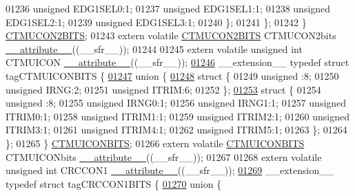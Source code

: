 \begin{DoxyCode}
01236       \textcolor{keywordtype}{unsigned} EDG1SEL0:1;
01237       \textcolor{keywordtype}{unsigned} EDG1SEL1:1;
01238       \textcolor{keywordtype}{unsigned} EDG1SEL2:1;
01239       \textcolor{keywordtype}{unsigned} EDG1SEL3:1;
01240     \};
01241   \};
01242 \} \hyperlink{a00008_d0/d65/a00360}{CTMUCON2BITS};
01243 \textcolor{keyword}{extern} \textcolor{keyword}{volatile} \hyperlink{a00008_d0/d65/a00360}{CTMUCON2BITS} CTMUCON2bits \hyperlink{a00009_a493c46f03454991ccc5aa7a6e1dfb2a7}{\_\_attribute\_\_}((\_\_sfr\_\_));
01244 
01245 \textcolor{keyword}{extern} \textcolor{keyword}{volatile} \textcolor{keywordtype}{unsigned} \textcolor{keywordtype}{int}  CTMUICON \hyperlink{a00009_a493c46f03454991ccc5aa7a6e1dfb2a7}{\_\_attribute\_\_}((\_\_sfr\_\_));
\hypertarget{a00009_source_l01246}{}\hyperlink{a00008}{01246} \_\_extension\_\_ \textcolor{keyword}{typedef} \textcolor{keyword}{struct }tagCTMUICONBITS \{
\hypertarget{a00009_source_l01247}{}\hyperlink{a00009}{01247}   \textcolor{keyword}{union }\{
\hypertarget{a00009_source_l01248}{}\hyperlink{a00009}{01248}     \textcolor{keyword}{struct }\{
01249       \textcolor{keywordtype}{unsigned} :8;
01250       \textcolor{keywordtype}{unsigned} IRNG:2;
01251       \textcolor{keywordtype}{unsigned} ITRIM:6;
01252     \};
\hypertarget{a00009_source_l01253}{}\hyperlink{a00009}{01253}     \textcolor{keyword}{struct }\{
01254       \textcolor{keywordtype}{unsigned} :8;
01255       \textcolor{keywordtype}{unsigned} IRNG0:1;
01256       \textcolor{keywordtype}{unsigned} IRNG1:1;
01257       \textcolor{keywordtype}{unsigned} ITRIM0:1;
01258       \textcolor{keywordtype}{unsigned} ITRIM1:1;
01259       \textcolor{keywordtype}{unsigned} ITRIM2:1;
01260       \textcolor{keywordtype}{unsigned} ITRIM3:1;
01261       \textcolor{keywordtype}{unsigned} ITRIM4:1;
01262       \textcolor{keywordtype}{unsigned} ITRIM5:1;
01263     \};
01264   \};
01265 \} \hyperlink{a00008_d9/d9b/a00363}{CTMUICONBITS};
01266 \textcolor{keyword}{extern} \textcolor{keyword}{volatile} \hyperlink{a00008_d9/d9b/a00363}{CTMUICONBITS} CTMUICONbits \hyperlink{a00009_a493c46f03454991ccc5aa7a6e1dfb2a7}{\_\_attribute\_\_}((\_\_sfr\_\_));
01267 
01268 \textcolor{keyword}{extern} \textcolor{keyword}{volatile} \textcolor{keywordtype}{unsigned} \textcolor{keywordtype}{int}  CRCCON1 \hyperlink{a00009_a493c46f03454991ccc5aa7a6e1dfb2a7}{\_\_attribute\_\_}((\_\_sfr\_\_));
\hypertarget{a00009_source_l01269}{}\hyperlink{a00008}{01269} \_\_extension\_\_ \textcolor{keyword}{typedef} \textcolor{keyword}{struct }tagCRCCON1BITS \{
\hypertarget{a00009_source_l01270}{}\hyperlink{a00009}{01270}   \textcolor{keyword}{union }\{

\end{DoxyCode}
